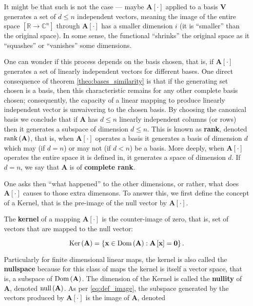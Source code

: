 	It might be that such is not the case — maybe $\mathbf{A}\left[\cdot\right]$ applied to a basis $\mathbf{V}$ generates a set of $d\leq n$ independent vectors, meaning the image of the entire space $\left[\mathbb{R}\to\mathbb{C}^n\right]$ through $\mathbf{A}\left[\cdot\right]$ has a smaller dimension $i$ (it is ``smaller'' than the original space). In some sense, the functional ``shrinks'' the original space as it ``squashes'' or ``vanishes'' some dimensions.

	One can wonder if this process depends on the basis chosen, that is, if $\mathbf{A}\left[\cdot\right]$ generates a set of linearly independent vectors for different bases. One direct consequence of theorem \ref{theo:bases_similarity} is that if the generating set chosen is a basis, then this characteristic remains for any other complete basis chosen; consequently, the capacity of a linear mapping to produce linearly independent vector is unwaivering to the chosen basis. By choosing the canonical basis we conclude that if $\mathbf{A}$ has $d\leq n$ linearly independent columns (or rows) then it generates a subspace of dimension $d\leq n$. This is known as \textbf{rank}, denoted $\operatorname{rank}\left(\mathbf{A}\right)$, that is, when $\mathbf{A}\left[\cdot\right]$ operates a basis it generates a basis of dimension $d$ which may (if $d=n$) or may not (if $d < n$) be a basis. More deeply, when $\mathbf{A}\left[\cdot\right]$ operates the entire space it is defined in, it generates a space of dimension $d$. If $d=n$, we say that $\mathbf{A}$ is of \textbf{complete rank}.

	One asks then ``what happened'' to the other dimensions, or rather, what does $\mathbf{A}\left[\cdot\right]$ causes to those extra dimensons. To answer this, we first define the concept of a Kernel, that is the pre-image of the null vector by $\mathbf{A}\left[\cdot\right]$.

\begin{definition} The \textbf{kernel} of a mapping $\mathbf{A}\left[\cdot\right]$ is the counter-image of zero, that is, set of vectors that are mapped to the null vector:
	
\begin{equation} \operatorname{Ker}\left(\mathbf{A}\right) = \left\{\mathbf{x}\in\operatorname{Dom}\left(\mathbf{A}\right): \mathbf{A}\left[\mathbf{x}\right] = \mathbf{0}\right\} .\end{equation}
\end{definition}

	Particularly for finite dimensional linear maps, the kernel is also called the \textbf{nullspace} because for this class of maps the kernel is itself a vector space, that is, a subspace of $\operatorname{Dom}\left(\mathbf{A}\right)$. The dimension of the Kernel is called the \textbf{nullity} of $\mathbf{A}$, denoted $\operatorname{null}\left(\mathbf{A}\right)$. As per \eqref{eq:def_image}, the subspace generated by the vectors produced by $\mathbf{A}\left[\cdot\right]$ is the image of $\mathbf{A}$, denoted

